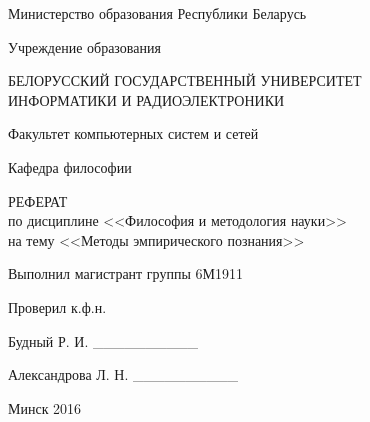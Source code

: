 \begin{titlepage}
\thispagestyle{empty}
\setlength{\parindent}{0cm} %

{\centering{}
  Министерство образования Республики Беларусь

  \smallskip
  Учреждение образования

  БЕЛОРУССКИЙ ГОСУДАРСТВЕННЫЙ УНИВЕРСИТЕТ \\
  ИНФОРМАТИКИ И РАДИОЭЛЕКТРОНИКИ

  \smallskip
  Факультет компьютерных систем и сетей

  \smallskip
  Кафедра философии\par
}

\vspace{50mm}

{\centering{}
  РЕФЕРАТ \\
  по дисциплине <<Философия и методология науки>> \\
  на тему <<Методы эмпирического познания>>\par
}

\vspace{50mm}

\begin{minipage}{.52\linewidth}
  Выполнил магистрант группы 6М1911

  \smallskip
  Проверил к.ф.н.
\end{minipage}
\hfill
\begin{minipage}{.47\linewidth}
  \begin{flushright}
    Будный Р. И. \_\_\_\_\_\_\_\_\_\_

    \smallskip
    Александрова Л. Н. \_\_\_\_\_\_\_\_\_\_
  \end{flushright}
\end{minipage}

\vfill
{\centering{}
  Минск 2016\par
}

\setlength{\parindent}{1.25cm} %
\end{titlepage}
